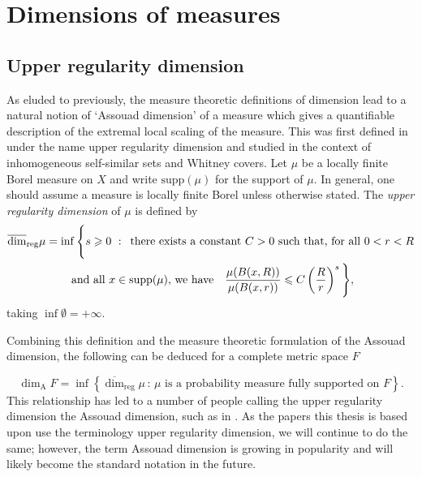 \section{Dimensions of measures}
\label{sec:intro-measures}

\subsection{Upper regularity dimension}
\label{sec:intro-upper-reg}

As eluded to previously, the measure theoretic definitions of dimension lead to a natural notion of `Assouad dimension' of a measure which gives a quantifiable description of the extremal local scaling of the measure. This was first defined in \cite{anti1,anti2} under the name upper regularity dimension and studied in the context of inhomogeneous self-similar sets and Whitney covers. Let $\mu$ be a locally finite Borel measure on $X$ and write $\text{supp}(\mu)$ for the support of $\mu$. In general, one should assume a measure is locally finite Borel unless otherwise stated. The \textit{upper regularity dimension} of $\mu$ is defined by 
\begin{multline*} 
\urdim \mu = \inf \Bigg\{ s \geq 0 \, \,  : \,  \text{ there exists a  constant }C  > 0\text{  such that, for all  $0< r< R $} \\ \text{  and all $x \in \text{supp} (\mu)$, we have }  \ \  \frac{\mu(B(x,R))}{\mu(B(x,r))} \leq C\left(\frac{R}{r}\right)^{s} \Bigg\},
\end{multline*}
taking $\inf \emptyset = + \infty$. 

Combining this definition and the measure theoretic formulation of the Assouad dimension, the following can be deduced for a complete metric space $F$

\begin{equation}\label{equa:ass-reg-relation}
    \dim_{\text{A}} F = \inf \left\{ \overline{\dim}_{\text{reg}} \mu \,  \colon \, \mu \text{ is a probability measure fully supported on } F\right\}.
\end{equation}
This relationship has led to a number of people calling the upper regularity dimension the Assouad dimension, such as in \cite{hare-hare-tros, hare-troscheit, fraser-kaenmaki-proj}. As the papers this thesis is based upon use the terminology upper regularity dimension, we will continue to do the same; however, the term Assouad dimension is growing in popularity and will likely become the standard notation in the future.

